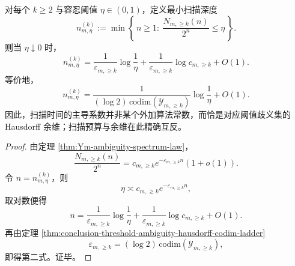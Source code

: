 \begin{theorem}\label{thm:conclusion-scan-budget-codim-duality}
对每个 \(k\ge 2\) 与容忍阈值 \(\eta\in(0,1)\)，定义最小扫描深度
\[
n_{m,\eta}^{(k)}
:=
\min\left\{\,n\ge 1:\ \frac{N_{m,\ge k}(n)}{2^n}\le \eta\,\right\}.
\]
则当 \(\eta\downarrow 0\) 时，
\[
n_{m,\eta}^{(k)}
=
\frac{1}{\varepsilon_{m,\ge k}}\log\frac1\eta
+\frac{1}{\varepsilon_{m,\ge k}}\log c_{m,\ge k}
+O(1).
\]
等价地，
\[
n_{m,\eta}^{(k)}
=
\frac{1}{(\log 2)\,\mathrm{codim}(\mathcal Y_{m,\ge k})}
\log\frac1\eta
+O(1).
\]
因此，扫描时间的主导系数并非某个外加算法常数，而恰是对应阈值歧义集的 Hausdorff 余维；扫描预算与余维在此精确互反。
\end{theorem}
\begin{proof}
由定理 \ref{thm:Ym-ambiguity-spectrum-law}，
\[
\frac{N_{m,\ge k}(n)}{2^n}
=
c_{m,\ge k}e^{-\varepsilon_{m,\ge k}n}(1+o(1)).
\]
令 \(n=n_{m,\eta}^{(k)}\)，则
\[
\eta\asymp c_{m,\ge k}e^{-\varepsilon_{m,\ge k}n},
\]
取对数便得
\[
n
=
\frac{1}{\varepsilon_{m,\ge k}}\log\frac1\eta
+\frac{1}{\varepsilon_{m,\ge k}}\log c_{m,\ge k}
+O(1).
\]
再由定理 \ref{thm:conclusion-threshold-ambiguity-hausdorff-codim-ladder}
\[
\varepsilon_{m,\ge k}=(\log 2)\,\mathrm{codim}(\mathcal Y_{m,\ge k}),
\]
即得第二式。证毕。
\end{proof}

